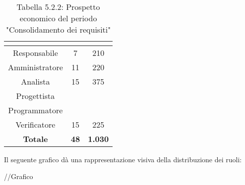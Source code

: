 \renewcommand{\arraystretch}{1.5}
\begin{table}[H]
\begin{center}
\begin{tabular}{|c|c|c|}
\hline
\rowcolor{title_row}
\textbf{\color{title_text}{Ruolo}}  & \textbf{\color{title_text}{Ore}} & \textbf{\color{title_text}{Costo in \euro}} \\ \hline
Responsabile    & 7 & 210 \\ \hline
Amministratore  & 11 & 220 \\ \hline
Analista        & 15 & 375 \\ \hline
Progettista     & & \\ \hline
Programmatore   & & \\ \hline
Verificatore    & 15 & 225 \\ \hline
\textbf{Totale} & \textbf{48}    & \textbf{1.030}    \\ \hline
\end{tabular}
\caption{Tabella 5.2.2: Prospetto economico del periodo "Consolidamento dei requisiti"\label{}}
\end{center}
\end{table}
\renewcommand{\arraystretch}{1}

Il seguente grafico dà una rappresentazione visiva della distribuzione dei ruoli: \\
\begin{center}
//Grafico
\end{center}

\pagebreak